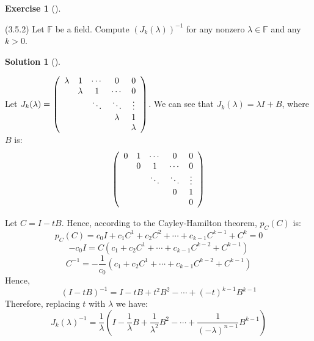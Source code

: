 \documentclass[numbers=enddot,12pt,final,onecolumn,notitlepage]{scrartcl}
\newcounter{exer}
\newcounter{sol}
\theoremstyle{definition}
\newtheorem{exmp}[exer]{Exercise}
\newenvironment{exercise}[1][]
{\begin{exmp}[#1]\begin{leftbar}}
        {\end{leftbar}\end{exmp}}
\newtheorem{solu}[sol]{Solution}
\newenvironment{solution}[1][]
{\begin{solu}[#1]\begin{leftbar}}
        {\end{leftbar}\end{solu}}
\begin{document}
\begin{exercise}
	 (3.5.2) Let $\mathbb{F}$ be a field. Compute $\left(  J_{k}\left(
		\lambda\right)  \right)  ^{-1}$ for any nonzero $\lambda\in\mathbb{F}$ and any
	$k>0$.
\end{exercise}

\begin{solution}
	Let $J_k(\lambda) =
		\left(
		\begin{array}[c]{ccccc}
				\lambda  & 1        & \cdots   & 0        & 0       \\
				\text{ } & \lambda  & 1        & \cdots   & 0       \\
				\text{ } & \text{ } & \ddots   & \ddots   & \vdots  \\
				\text{ } & \text{ } & \text{ } & \lambda  & 1       \\
				\text{ } & \text{ } & \text{ } & \text{ } & \lambda
			\end{array}
		\right)$. We can see that $J_k(\lambda) = \lambda I + B$, where $B$ is:
	\[
		\left(
		\begin{array}[c]{ccccc}
				0        & 1        & \cdots   & 0        & 0      \\
				\text{ } & 0        & 1        & \cdots   & 0      \\
				\text{ } & \text{ } & \ddots   & \ddots   & \vdots \\
				\text{ } & \text{ } & \text{ } & 0        & 1      \\
				\text{ } & \text{ } & \text{ } & \text{ } & 0
			\end{array}
		\right)
	\]

	Let $C = I - tB$. Hence, according to the Cayley-Hamilton theorem, $p_C(C)$ is:
	\[
		p_C(C) = c_0I + c_1C^1 + c_2C^2 + \cdots + c_{k-1}C^{k-1} + C^k = 0
	\]
	\[
		-c_0I = C(c_1 + c_2C^1 + \cdots + c_{k-1}C^{k-2} + C^{k-1})
	\]
	\[
		C^{-1} = -\frac{1}{c_0}(c_1 + c_2C^1 + \cdots + c_{k-1}C^{k-2} + C^{k-1})
	\]
	Hence,
	\[
		(I - tB)^{-1} = I - tB + t^2B^2 - \cdots + (-t)^{k-1}B^{k-1}
	\]
	Therefore, replacing $t$ with $\lambda$ we have:
	\[
		J_k(\lambda)^{-1} = \frac{1}{\lambda}(I - \frac{1}{\lambda}B + \frac{1}{\lambda^2}B^2 - \cdots + \frac{1}{(-\lambda)^{n-1}}B^{k-1})
	\]

\end{solution}
\end{document}
